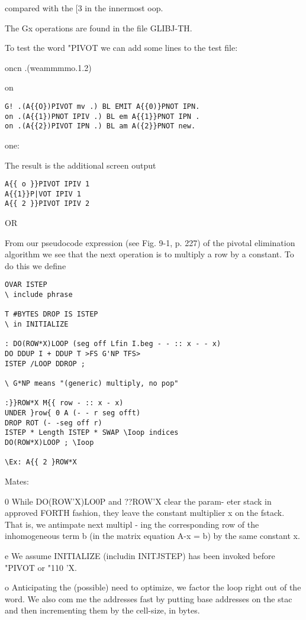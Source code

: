 {{{{{{{{{compared with the [3 in the innermost oop.

The Gx operations are found in the file GLIBJ-TH.

To test the word "PIVOT we can add some lines to the test file:

oncn .(weammmmo.1.2)

on

\begin{verbatim}
G! .(A{{O})PIVOT mv .) BL EMIT A{{0)}PNOT IPN.
on .(A{{1})PNOT IPIV .) BL em A{{1}}PNOT IPN .
on .(A{{2})PIVOT IPN .) BL am A({2}}PNOT new.
\end{verbatim}
one:


The result is the additional screen output

\begin{verbatim}
A{{ o }}PIVOT IPIV 1
A{{1}}P|VOT IPIV 1
A{{ 2 }}PIVOT IPIV 2
\end{verbatim}
OR

From our pseudocode expression (see Fig. 9-1, p. 227) of the
pivotal elimination algorithm we see that the next operation is to
multiply a row by a constant. To do this we define

\begin{verbatim}
OVAR ISTEP
\ include phrase

T #BYTES DROP IS ISTEP
\ in INITIALIZE

: DO(ROW*X)LOOP (seg off Lfin I.beg - - :: x - - x)
DO DDUP I + DDUP T >FS G'NP TFS>
ISTEP /LOOP DDROP ;

\ G*NP means "(generic) multiply, no pop"

:}}ROW*X M{{ row - :: x - x)
UNDER }row{ 0 A (- - r seg offt)
DROP ROT (- -seg off r)
ISTEP * Length ISTEP * SWAP \Ioop indices
DO(ROW*X)LOOP ; \Ioop

\Ex: A{{ 2 }ROW*X

\end{verbatim}
Mates:

0 While DO(ROW'X)LO0P and ??ROW'X clear the param-
eter stack in approved FORTH fashion, they leave the constant
multiplier x on the fstack. That is, we antimpate next multipl -
ing the corresponding row of the inhomogeneous term b (in
the matrix equation A-x = b) by the same constant x.

e We assume INITIALIZE (includin INITJSTEP) has been
invoked before "PIVOT or "110 'X.

o Anticipating the (possible) need to optimize, we factor the loop
right out of the word. We also com me the addresses fast by
putting base addresses on the stac and then incrementing
them by the cell-size, in bytes.

}}}}}}}}}
